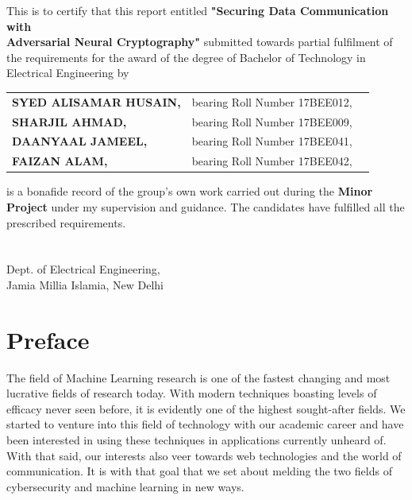 \documentclass[a4paper]{article}
\begin{document}
  \noindent This is to certify that this report entitled {\bfseries "Securing Data Communication with\\ 
  Adversarial Neural Cryptography"} submitted towards partial fulfilment of the requirements for
  the award of the degree of Bachelor of Technology in Electrical Engineering by\\

  \begin{tabular}{l c c }
    {\bfseries SYED ALISAMAR HUSAIN,} & bearing Roll Number 17BEE012,\\
    {\bfseries SHARJIL AHMAD,} & bearing Roll Number 17BEE009,\\
    {\bfseries DAANYAAL JAMEEL,} & bearing Roll Number 17BEE041,\\
    {\bfseries FAIZAN ALAM,} & bearing Roll Number 17BEE042,\\
  \end{tabular} 
  \vspace*{0.125in}

  \noindent is a bonafide record of the group's own work carried out during the {\bfseries Minor Project} 
  under my supervision and guidance. The candidates have fulfilled all the prescribed requirements.\\\\
  \\
  Dept. of Electrical Engineering,\\
  Jamia Millia Islamia, New Delhi
  \vspace*{\fill}
  \thispagestyle{empty}


  \newpage
  \vspace*{1in}
  \section*{Preface}
  The field of Machine Learning research is one of the fastest changing and most lucrative fields
  of research today. With modern techniques boasting levels of efficacy never seen before, it is
  evidently one of the highest sought-after fields. We started to venture into this field of technology
  with our academic career and have been interested in using these techniques in applications currently
  unheard of. With that said, our interests also veer towards web technologies and the world
  of communication. It is with that goal that we set about melding the two fields of cybersecurity
  and machine learning in new ways.
\end{document}
